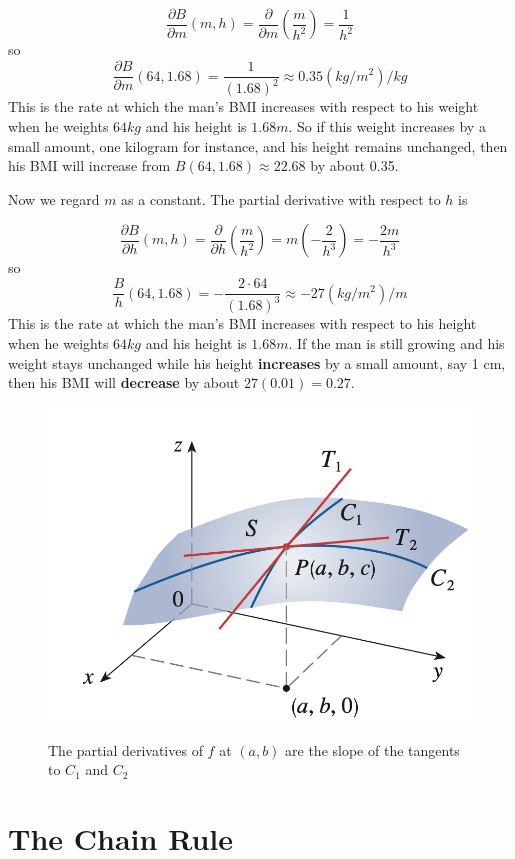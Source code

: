 $$
    \frac{\partial B}{\partial m}(m, h)=\frac{\partial}{\partial m}(\frac{m}{h^2})=\frac{1}{h^2}
$$
so
$$
    \frac{\partial B}{\partial m}(64, 1.68)=\frac{1}{(1.68)^2} \approx 0.35(kg/m^2)/kg
$$
This is the rate at which the man's BMI increases with respect to his weight when he weights $64kg$ and his height is $1.68m$. So if this weight increases by a small amount, one kilogram for instance, and his height remains unchanged, then his BMI will increase from $B(64, 1.68) \approx 22.68$ by about 0.35.

Now we regard $m$ as a constant. The partial derivative with respect to $h$ is 

$$
    \frac{\partial B}{\partial h}(m, h) = \frac{\partial }{\partial h}(\frac{m}{h^2})=m(-\frac{2}{h^3}) = -\frac{2m}{h^3}
$$
so
$$
    \frac{B}{h}(64, 1.68)=-\frac{2 \cdot 64}{(1.68)^3} \approx -27(kg/m^2)/m
$$
This is the rate at which the man's BMI increases with respect to his height when he weights $64kg$ and his height is $1.68m$. If the man is still growing and his weight stays unchanged while his height \textbf{increases} by a small amount, say 1 cm, then his BMI will \textbf{decrease} by about $27(0.01) = 0.27$.


\begin{figure}[h]
    \centering
    \cite{calculus}
    \includegraphics[scale=0.6]{chapter001/figures/fig007}
    \caption{The partial derivatives of $f$ at $(a, b)$ are the slope of the tangents to $C_1$ and $C_2$}
    \label{fig:Fig7}
\end{figure}

\section{The Chain Rule}


